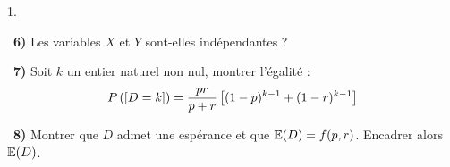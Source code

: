 \documentclass[11pt]{article}%
\begin{document}
\begin{noliste}{1.}
\item[ \ \textbf{6)}] Les variables $X$ et $Y$ sont-elles indépendantes
?

\item[ \ \textbf{7)}] Soit $k$ un entier naturel non nul, montrer
l'égalité : 
\[
P\left(\left[ {D = k} \right]\right) = {\frac{pr}{p + r}}\left[ (1-p)^{k-1} +
(1-r)^{k-1}\right] 
\]

\item[ \ \textbf{8)}] Montrer que $D$ admet une espérance et que $\mathbb{E}(D)
= f(p,r)$. Encadrer alors $\mathbb{E}(D)$.
\end{noliste}

\vspace{1cm}
\end{document}
